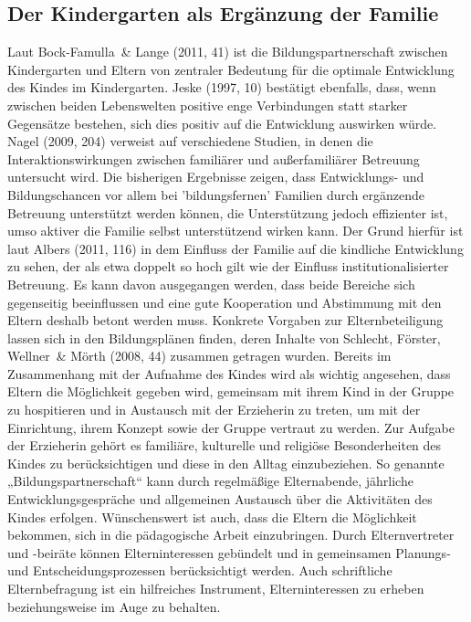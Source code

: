 \subsection{Der Kindergarten als Ergänzung der Familie}
Laut Bock-Famulla~\& Lange (2011, 41) ist die Bildungspartnerschaft zwischen Kindergarten und Eltern von zentraler Bedeutung für die optimale Entwicklung des Kindes im Kindergarten. Jeske (1997, 10) bestätigt ebenfalls, dass, wenn zwischen beiden Lebenswelten positive enge Verbindungen statt starker Gegensätze bestehen, sich dies positiv auf die Entwicklung auswirken würde. Nagel (2009, 204) verweist auf verschiedene Studien, in denen die Interaktionswirkungen zwischen familiärer und außerfamiliärer Betreuung untersucht wird. Die bisherigen Ergebnisse zeigen, dass Entwicklungs- und Bildungschancen vor allem bei ’bildungsfernen’ Familien durch ergänzende Betreuung unterstützt werden können, die Unterstützung jedoch effizienter ist, umso aktiver die Familie selbst unterstützend wirken kann. Der Grund hierfür ist laut Albers (2011, 116) in dem Einfluss der Familie auf die kindliche Entwicklung zu sehen, der als etwa doppelt so hoch gilt wie der Einfluss institutionalisierter Betreuung. Es kann davon ausgegangen werden, dass beide Bereiche sich gegenseitig beeinflussen und eine gute Kooperation und Abstimmung mit den Eltern deshalb betont werden muss. Konkrete Vorgaben zur Elternbeteiligung lassen sich in den Bildungsplänen finden, deren Inhalte von Schlecht, Förster, Wellner~\& Mörth (2008, 44) zusammen getragen wurden. Bereits im Zusammenhang mit der Aufnahme des Kindes wird als wichtig angesehen, dass Eltern die Möglichkeit gegeben wird, gemeinsam mit ihrem Kind in der Gruppe zu hospitieren und in Austausch mit der Erzieherin zu treten, um mit der Einrichtung, ihrem Konzept sowie der Gruppe vertraut zu werden. Zur Aufgabe der Erzieherin gehört es familiäre, kulturelle und religiöse Besonderheiten des Kindes zu berücksichtigen und diese in den Alltag einzubeziehen. So genannte „Bildungspartnerschaft“ kann durch regelmäßige Elternabende, jährliche Entwicklungsgespräche und allgemeinen Austausch über die Aktivitäten des Kindes erfolgen. Wünschenswert ist auch, dass die Eltern die Möglichkeit bekommen, sich in die pädagogische Arbeit einzubringen. Durch Elternvertreter und -beiräte können Elterninteressen gebündelt und in gemeinsamen Planungs- und Entscheidungsprozessen berücksichtigt werden. Auch schriftliche Elternbefragung ist ein hilfreiches Instrument, Elterninteressen zu erheben beziehungsweise im Auge zu behalten. 

